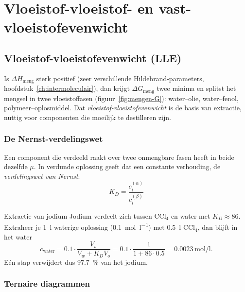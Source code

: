 \section{Vloeistof-vloeistof- en vast-vloeistofevenwicht}

\subsection{Vloeistof-vloeistofevenwicht (LLE)}
\label{sec:lle}

Is $\Delta H_{\text{meng}}$ sterk positief (zeer verschillende Hildebrand-parameters, hoofdstuk~\ref{ch:intermoleculair}), dan krijgt $\Delta G_{\text{meng}}$ twee minima en splitst het mengsel in twee vloeistoffasen (figuur~\ref{fig:mengen-G}): water--olie, water--fenol, polymeer--oplosmiddel. Dat \emph{vloeistof-vloeistofevenwicht} is de basis van extractie, nuttig voor componenten die moeilijk te destilleren zijn.

\subsubsection{De Nernst-verdelingswet}
\label{sec:nernst}

Een component die verdeeld raakt over twee onmengbare fasen heeft in beide dezelfde $\mu$. In verdunde oplossing geeft dat een constante verhouding, de \emph{verdelingswet van Nernst}:
\begin{equation}
\boxed{\;K_D = \frac{c_i^{(\alpha)}}{c_i^{(\beta)}}\;}
\label{eq:nernst-verdeling}
\end{equation}

\begin{voorbeeld}{Extractie van jodium}
Jodium verdeelt zich tussen $\mathrm{CCl_4}$ en water met $K_D \approx 86$. Extraheer je \SI{1}{\litre} waterige oplossing (\SI{0.1}{\mole\per\litre}) met \SI{0.5}{\litre} $\mathrm{CCl_4}$, dan blijft in het water
\[
c_{\text{water}} = 0.1 \cdot \frac{V_w}{V_w + K_D V_o} = 0.1 \cdot \frac{1}{1 + 86 \cdot 0.5} = \SI{0.0023}{\mole\per\litre}.
\]
E\'en stap verwijdert dus \SI{97.7}{\percent} van het jodium.
\end{voorbeeld}

\subsubsection{Ternaire diagrammen}
\label{sec:ternair}

